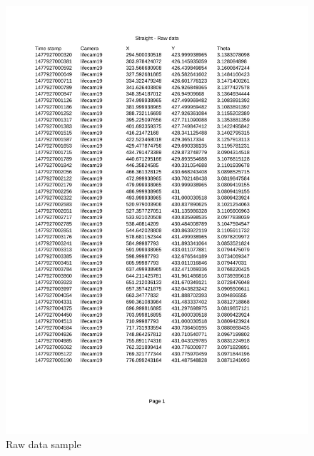 \documentclass[paper=a4, fontsize=11pt]{scrartcl} %
\begin{document}
    \begin{figure}[h!]
        \begin{center}
            \setlength{\fboxsep}{0.5pt} %
            \setlength{\fboxrule}{0.5pt}
            \includegraphics[width=12cm,fbox]{images/Raw_data}
            \caption{Raw data sample}
            \label{Raw_data}
        \end{center}
    \end{figure}
    
\end{document}

